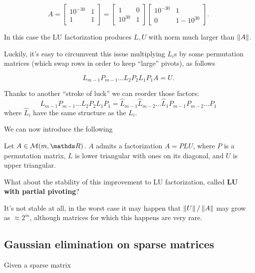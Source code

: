 \documentclass[computationalMathematics.tex]{subfiles}
\begin{document}
\begin{example}
\[
A = \begin{bmatrix}
    10^{-30} & 1\\
    1 & 1
\end{bmatrix} = \begin{bmatrix}
    1 & 0\\
    10^{30} & 1 
\end{bmatrix}
\begin{bmatrix}
    10^{-30} & 1\\
    0 & 1-10^{30}
\end{bmatrix}.
\]

In this case the LU factorization produces $L,U$ with norm much larger than $\left\lVert A\right\rVert$.
\end{example}

Luckily, it's easy to circumvent this issue multiplying $L_i$s by some permutation matrices (which swap rows in order to keep ``large'' pivots), as follows

\[
L_{m-1}P_{m-1}\dots L_2P_2L_1P_1A = U.
\]

\begin{obs}
Thanks to another ``stroke of luck'' we can reorder those factors: 
\[
L_{m-1}P_{m-1}\dots L_2P_2L_1P_1 = \widehat{L}_{m-1}\widehat{L}_{m-2}\dots \widehat{L}_1 P_{m-1}P_{m-2}\dots P_1
\]
where $\widehat{L}_i$ have the same structure as the $L_i$.
\end{obs}

We can now introduce the following

\begin{theorem}
  Let $A \in \mathcal{M}(m, \R)$. $A$ admits a factorization $A=PLU$, where $P$ is a permutation matrix, $L$ is lower triangular with ones on its diagonal, and $U$ is upper triangular.
\end{theorem}

What about the stability of this improvement to LU factorization, called \textbf{LU with partial pivoting}?

It's not stable at all, in the worst case it may happen that $\left\lVert U\right\rVert / \left\lVert A\right\rVert$ may grow as $\approx 2^m$, although matrices for which this happens are very rare.

\subsection{Gaussian elimination on sparse matrices}

Given a sparse matrix 
\end{document}
